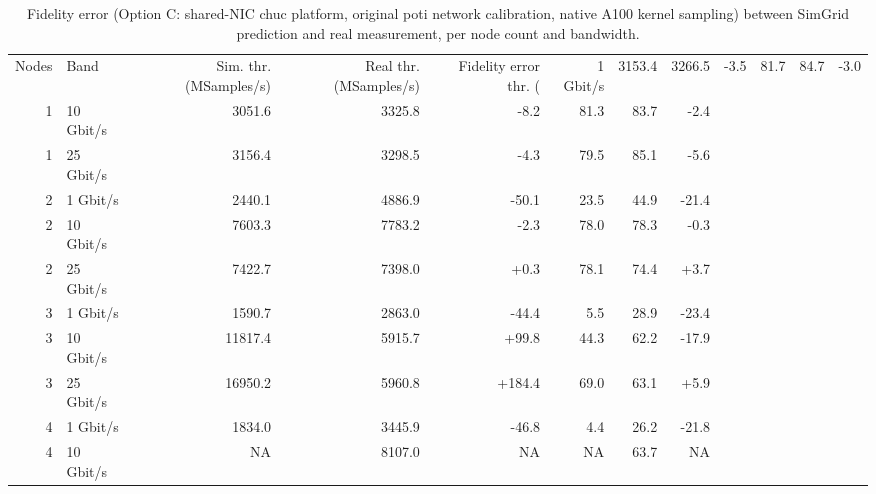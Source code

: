\begin{table}[htbp]
  \centering
  \caption{Fidelity error (Option C: shared-NIC chuc platform, original poti network calibration, native A100 kernel sampling) between SimGrid prediction and real measurement, per node count and bandwidth.}
  \label{tab:fidelity-error}
  \begin{tabular}{rlrrrrrr}
    \toprule
    Nodes & Band & Sim. thr. (MSamples/s) & Real thr. (MSamples/s) & Fidelity error thr. (%
     & 1 Gbit/s & 3153.4 & 3266.5 & -3.5 & 81.7 & 84.7 & -3.0 \\
    1 & 10 Gbit/s & 3051.6 & 3325.8 & -8.2 & 81.3 & 83.7 & -2.4 \\
    1 & 25 Gbit/s & 3156.4 & 3298.5 & -4.3 & 79.5 & 85.1 & -5.6 \\
    2 & 1 Gbit/s & 2440.1 & 4886.9 & -50.1 & 23.5 & 44.9 & -21.4 \\
    2 & 10 Gbit/s & 7603.3 & 7783.2 & -2.3 & 78.0 & 78.3 & -0.3 \\
    2 & 25 Gbit/s & 7422.7 & 7398.0 & +0.3 & 78.1 & 74.4 & +3.7 \\
    3 & 1 Gbit/s & 1590.7 & 2863.0 & -44.4 & 5.5 & 28.9 & -23.4 \\
    3 & 10 Gbit/s & 11817.4 & 5915.7 & +99.8 & 44.3 & 62.2 & -17.9 \\
    3 & 25 Gbit/s & 16950.2 & 5960.8 & +184.4 & 69.0 & 63.1 & +5.9 \\
    4 & 1 Gbit/s & 1834.0 & 3445.9 & -46.8 & 4.4 & 26.2 & -21.8 \\
    4 & 10 Gbit/s & NA & 8107.0 & NA & NA & 63.7 & NA \\
    \bottomrule
  \end{tabular}
\end{table}

